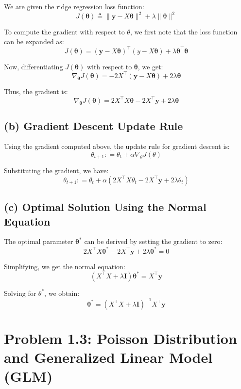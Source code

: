 \documentclass[12pt]{article}
\begin{document}
We are given the ridge regression loss function:
\[
J(\boldsymbol\theta) \triangleq \| \boldsymbol y - X \boldsymbol\theta \|^2 + \lambda \|\boldsymbol\theta\|^2
\]

To compute the gradient with respect to \( \theta \), we first note that the loss function can be expanded as:
\[
J(\boldsymbol\theta) = (\boldsymbol y - X\boldsymbol\theta)^\top (y - X\boldsymbol\theta) + \lambda \boldsymbol\theta^\top \boldsymbol\theta
\]

Now, differentiating \( J(\boldsymbol\theta) \) with respect to \( \boldsymbol\theta \), we get:
\[
\nabla_{\boldsymbol\theta} J(\boldsymbol\theta) = -2X^\top(\boldsymbol y - X \boldsymbol\theta) + 2\lambda\boldsymbol\theta
\]

Thus, the gradient is:
\[
\nabla_{\boldsymbol\theta} J(\boldsymbol\theta) = 2X^\top X \boldsymbol\theta - 2X^\top \boldsymbol y + 2\lambda \boldsymbol\theta
\]

\subsection*{(b) Gradient Descent Update Rule}

Using the gradient computed above, the update rule for gradient descent is:
\[
\theta_{t+1} \colon= \theta_{t} + \alpha \nabla_\theta J(\theta)
\]

Substituting the gradient, we have:
\[
    \theta_{t+1} \colon= \theta_{t} + \alpha \left( 2X^\top X \theta_t - 2X^\top \boldsymbol y + 2\lambda \theta_t \right)
\]

\subsection*{(c) Optimal Solution Using the Normal Equation}

The optimal parameter \( \boldsymbol\theta^* \) can be derived by setting the gradient to zero:
\[
2X^\top X \boldsymbol\theta^* - 2X^\top \boldsymbol y + 2\lambda \boldsymbol\theta^* = 0
\]

Simplifying, we get the normal equation:
\[
(X^\top X +\lambda \boldsymbol I)\boldsymbol\theta^* = X^\top \boldsymbol y
\]

Solving for \( \theta^* \), we obtain:
\[
    \boldsymbol\theta^* = (X^\top X + \lambda \boldsymbol I)^{-1} X^\top \boldsymbol y
\]

\newpage

\section*{Problem 1.3: Poisson Distribution and Generalized Linear Model (GLM)}
\end{document}
